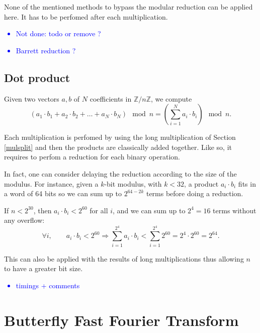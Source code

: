 \documentclass[a4paper]{article}
\begin{document}
\begin{remark}
    None of the mentioned methods to bypass the modular reduction can be applied here. It has to be perfomed after each multiplication.
\end{remark}

\textcolor{blue}{
    \begin{itemize}
        \item Not done: todo or remove ?
        \item Barrett reduction ?
    \end{itemize}
}

\subsection{Dot product}

Given two vectors $a,b$ of $N$ coefficients in $\mathbb{Z}/n\mathbb{Z}$, we compute
\[
\left(a_1\cdot b_1 + a_2\cdot b_2 + \dots + a_N\cdot b_N\right) \mod n = \left(\sum_{i=1}^N a_i\cdot b_i\right) \mod n.
\]

Each multiplication is perfomed by using the long multiplication of Section \ref{mulsplit} and then
the products are classically added together.
Like so, it requires to perfom a reduction for each binary operation.

\bigskip
In fact, one can consider delaying the reduction according to the size of the modulus.
For instance, given a $k$-bit modulus, with $k < 32$, a product $a_i\cdot b_i$ fits in a word of 64 bits so
we can sum up to $2^{64 - 2k}$ terms before doing a reduction.

\begin{example}
    If $n < 2^{30}$, then $a_i\cdot b_i < 2^{60}$ for all $i$, and we can sum up to $2^4 = 16$ terms without any overflow:
    \[
    \forall i, \qquad a_i\cdot b_i < 2^{60}  
    \Longrightarrow \sum_{i=1}^{2^4} a_i\cdot b_i < \sum_{i=1}^{2^4} 2^{60} = 2^4 \cdot 2^{60} = 2^{64}.
    \]
\end{example}

\bigskip
This can also be applied with the results of long multiplications thus allowing $n$ to have a greater bit size.

\textcolor{blue}{
    \begin{itemize}
        \item timings + comments
    \end{itemize}
}

\section{Butterfly Fast Fourier Transform}
\end{document}
